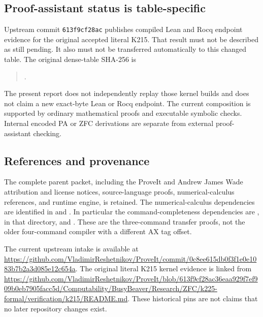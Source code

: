 \subsection{Proof-assistant status is table-specific}
Upstream commit \texttt{613f9cf28ac} publishes compiled Lean and Rocq endpoint evidence for the original accepted literal K215. That result must not be described as still pending. It also must not be transferred automatically to this changed table. The original dense-table SHA-256 is
\begin{quote}\small{}.\end{quote}
The present report does not independently replay those kernel builds and does not claim a new exact-byte Lean or Rocq endpoint. The current composition is supported by ordinary mathematical proofs and executable symbolic checks. Internal encoded PA or ZFC derivations are separate from external proof-assistant checking.

\subsection{References and provenance}
The complete parent packet, including the ProveIt and Andrew James Wade attribution and license notices, source-language proofs, numerical-calculus references, and runtime engine, is retained. The numerical-calculus dependencies are identified in  and . In particular the command-completeness dependencies are ,  in that directory, and . These are the three-command transfer proofs, not the older four-command compiler with a different AX tag offset.

The current upstream intake is available at \url{https://github.com/VladimirReshetnikov/ProveIt/commit/0c8ee615db0f3f1e0e1083b7b2a3d085e12c654a}. The original literal K215 kernel evidence is linked from \url{https://github.com/VladimirReshetnikov/ProveIt/blob/613f9cf28ac36eaa929f7ef909b0eb7905facc5d/Computability/BusyBeaver/Research/ZFC/k225-formal/verification/k215/README.md}. These historical pins are not claims that no later repository changes exist.
